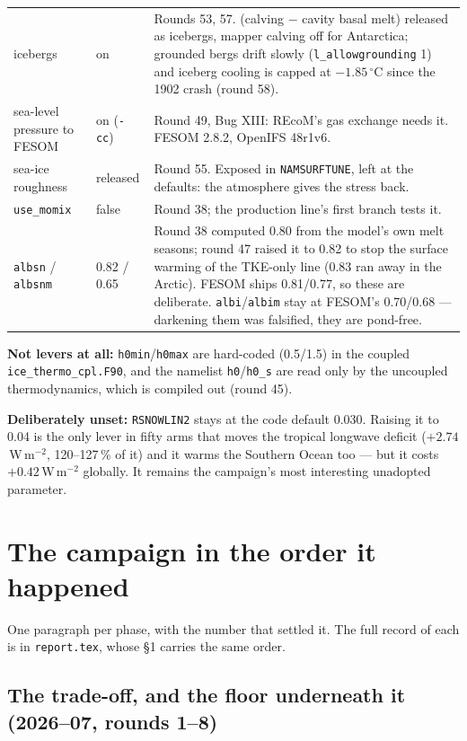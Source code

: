 \documentclass[10pt]{article}
\begin{document}
{\begin{longtable}{p{4.0cm}p{2.3cm}p{9.4cm}}
icebergs & on & Rounds 53, 57. (calving $-$ cavity basal melt) released as icebergs, mapper calving off
for Antarctica; grounded bergs drift slowly (\texttt{l\_allowgrounding} 1) and iceberg cooling is capped
at $-1.85\,^\circ$C since the 1902 crash (round 58). \\
sea-level pressure to FESOM & on (\texttt{-cc}) & Round 49, Bug XIII: REcoM's gas exchange needs it.
FESOM 2.8.2, OpenIFS 48r1v6. \\
sea-ice roughness & released & Round 55. Exposed in \texttt{NAMSURFTUNE}, left at the defaults: the
atmosphere gives the stress back. \\
\texttt{use\_momix} & false & Round 38; the production line's first branch tests it. \\
\texttt{albsn} / \texttt{albsnm} & 0.82 / 0.65 & Round 38 computed 0.80 from the model's own
melt seasons; round 47 raised it to 0.82 to stop the surface warming of the TKE-only line (0.83 ran away
in the Arctic). FESOM ships 0.81/0.77, so these are deliberate. \texttt{albi}/\texttt{albim}
stay at FESOM's 0.70/0.68 --- darkening them was falsified, they are pond-free. \\
\bottomrule
\end{longtable}}

\textbf{Not levers at all:} \texttt{h0min}/\texttt{h0max} are hard-coded (0.5/1.5) in the
coupled \texttt{ice\_thermo\_cpl.F90}, and the namelist \texttt{h0}/\texttt{h0\_s} are read only
by the uncoupled thermodynamics, which is compiled out (round 45).

\textbf{Deliberately unset:} \texttt{RSNOWLIN2} stays at the code default 0.030. Raising it
to 0.04 is the only lever in fifty arms that moves the tropical longwave deficit
($+2.74$\,W\,m$^{-2}$, 120--127\,\% of it) and it warms the Southern Ocean too --- but it
costs $+0.42$\,W\,m$^{-2}$ globally. It remains the campaign's most interesting unadopted
parameter.

\section{The campaign in the order it happened}\label{sec:timeline}

One paragraph per phase, with the number that settled it. The full record of each is in
\texttt{report.tex}, whose \S1 carries the same order.

\subsection{The trade-off, and the floor underneath it (2026--07, rounds 1--8)}
\end{document}
